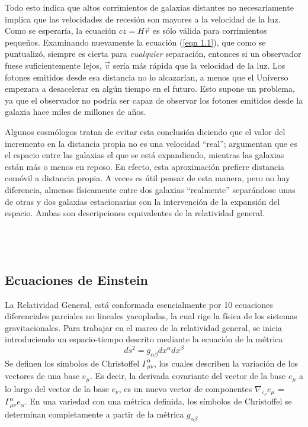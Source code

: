 \documentclass[a4paper,openright,12pt]{book}
\begin{document}
Todo esto indica que altos corrimientos de galaxias distantes no necesariamente implica que las velocidades de recesión son mayores a la velocidad de la luz. Como se esperaría, la ecuación $cz = H\vec{r}$ es sólo válida para corrimientos pequeños. Examinando nuevamente la ecuación (\ref{eqn 1.1}), que como se puntualizó, siempre es cierta para \textit{cualquier} separación, entonces si un observador fuese suficientemente lejos, $\vec{v}$ sería más rápida que la velocidad de la luz. Los fotones emitidos desde esa distancia no lo alcazarían, a menos que el Universo empezara a desacelerar en algún tiempo en el futuro. Esto supone un problema, ya que el observador no podría ser capaz de observar los fotones emitidos desde la galaxia hace miles de millones de años.

Algunos cosmólogos tratan de evitar esta conclusión diciendo que el valor del incremento en la distancia propia no es una velocidad ``real''; argumentan que es el espacio entre las galaxias el que se está expandiendo, mientras las galaxias están más o menos en reposo. En efecto, esta aproximación prefiere distancia comóvil a distancia propia. A veces es útil pensar de esta manera, pero no hay diferencia, almenos físicamente entre dos galaxias ``realmente'' separándose unas de otras y dos galaxias estacionarias con la intervención de la expansión del espacio. Ambas son descripciones equivalentes de la relatividad general.\\\\\\\\


\subsection*{Ecuaciones de Einstein}

La Relatividad General, está conformada esencialmente por 10 ecuaciones diferenciales parciales no lineales yacopladas, la cual rige la física de los sistemas gravitacionales. Para trabajar en el marco de la relatividad general, se inicia introduciendo un espacio-tiempo descrito mediante la ecuación de la métrica
\begin{equation}
ds^{2}=g_{\alpha \beta}dx^{\alpha}dx^{\beta}\label{eqn 1.11}
\end{equation}
Se definen los símbolos de Christoffel $\Gamma^{\alpha}_{\mu \nu}$, los cuales describen la variación de los vectores de una base $e_{\mu}$. Es decir, la derivada covariante del vector de la base $e_{\mu}$ a lo largo del vector de la base $e_{\nu}$, es un nuevo vector de componentes $\nabla_{e_{\nu}}e_{\mu}$ = $\Gamma^{\alpha}_{\mu \nu} e_{\alpha}$. En una variedad con una métrica definida, los símbolos de Christoffel se determinan completamente a partir de la métrica $g_{\alpha \beta}$
\end{document}

